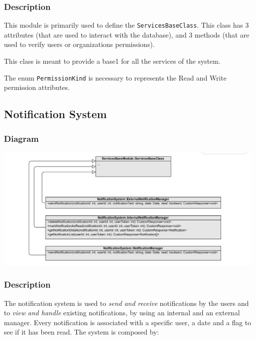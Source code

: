 \documentclass{article}
\begin{document}
\subsubsection{Description}

This module is primarily used to define the  \texttt{ServicesBaseClass}.
This class has 3 attributes (that are used to interact with the database), and
3 methods (that are used to verify users or organizations permissions).

This class is meant to provide a base1 for all the services of the system.

The enum \texttt{PermissionKind} is necessary to represents the Read and Write permission attributes.


\subsection{Notification System}
\subsubsection{Diagram}

\includegraphics[width=\textwidth,height=\textheight,keepaspectratio]{images/class_diagram/notificationSystem.jpg}

\subsubsection{Description}

The notification system is used to \textit{send and receive} notifications by the users and to \textit{view and handle} existing notifications, by using an internal and an external manager. Every notification is associated with a specific user, a date and a flag to see if it has been read. The system is composed by:
\end{document}
